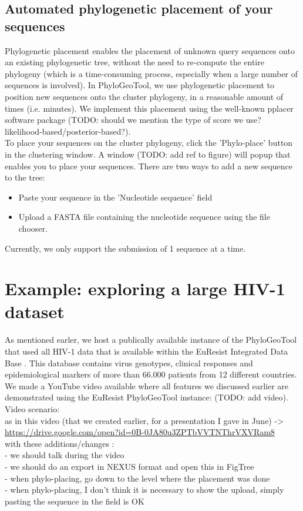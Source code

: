 \documentclass[a4paper, 11pt]{article} %
\begin{document}
\subsection{Automated phylogenetic placement of your sequences}
Phylogenetic placement enables the placement of unknown query sequences onto an existing phylogenetic tree, without the need to re-compute the entire phylogeny (which is a time-consuming process, especially when a large number of sequences is involved). In PhyloGeoTool, we use phylogenetic placement to position new sequences onto the cluster phylogeny, in a reasonable amount of times (i.e. minutes). We implement this placement using the well-known pplacer software package \cite{Matsen2010} (TODO: should we mention the type of score we use? likelihood-based/posterior-based?).\\
To place your sequences on the cluster phylogeny, click the 'Phylo-place' button in the clustering window. A window (TODO: add ref to figure) will popup that enables you to place your sequences. There are two ways to add a new sequence to the tree:
\begin{itemize}
\item Paste your sequence in the 'Nucleotide sequence' field
\item Upload a FASTA file containing the nucleotide sequence using the file chooser.
\end{itemize}
Currently, we only support the submission of 1 sequence at a time.

\section{Example: exploring a large HIV-1 dataset}

As mentioned earler, we host a publically available instance of the PhyloGeoTool that used all HIV-1 data that is available within the EuResist Integrated Data Base \cite{Zazzi2012}. 
This database contains virus genotypes, clinical responses and epidemiological markers of more than 66.000 patients from 12 different countries.
We made a YouTube video available where all features we discussed earlier are demonstrated using the EuResist PhyloGeoTool instance: (TODO: add video). \\

Video scenario:\\
 as in this video (that we created earlier, for a presentation I gave in June) -> \url{https://drive.google.com/open?id=0B-0JA80u3ZPTbVVTNThrVXVRam8} \\
 with these additions/changes :\\  
 - we should talk during the video \\
 - we should do an export in NEXUS format and open this in FigTree \\
 - when phylo-placing, go down to the level where the placement was done\\
 - when phylo-placing, I don't think it is necessary to show the upload, simply pasting the sequence in the field is OK \\



\end{document}
